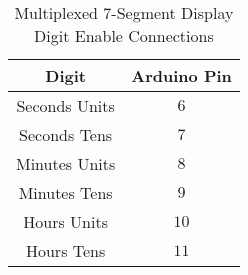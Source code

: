 
\begin{table}[h]
    \centering
    \begin{tabular}{|c|c|}
        \hline
        \textbf{Digit} & \textbf{Arduino Pin} \\
        \hline
        Seconds Units & $6$\\
        Seconds Tens  & $7$\\
        Minutes Units & $8$\\
        Minutes Tens  & $9$\\
        Hours Units   & $10$ \\
        Hours Tens    & $11$ \\
        \hline
    \end{tabular}
    \caption{Multiplexed 7-Segment Display Digit Enable Connections}
    \label{tab:multiplex}
\end{table}
